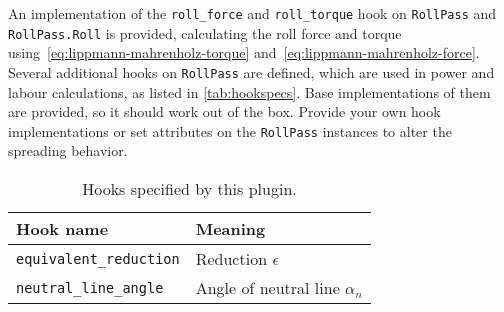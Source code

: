 \documentclass[11pt]{PyRollDocs}
\begin{document}
    An implementation of the \lstinline{roll_force} and \lstinline{roll_torque} hook on \lstinline{RollPass} and \lstinline{RollPass.Roll} is provided,
    calculating the roll force and torque using~\eqref{eq:lippmann-mahrenholz-torque} and~\eqref{eq:lippmann-mahrenholz-force}.
    Several additional hooks on \lstinline{RollPass} are defined, which are used in power and labour calculations, as listed in \autoref{tab:hookspecs}.
    Base implementations of them are provided, so it should work out of the box.
    Provide your own hook implementations or set attributes on the \lstinline{RollPass} instances to alter the spreading behavior.

    \begin{table}
        \centering
        \caption{Hooks specified by this plugin.}
        \label{tab:hookspecs}
        \begin{tabular}{ll}
            \toprule
            Hook name                                             & Meaning                                               \\
            \midrule
            \texttt{equivalent\_reduction}                        & Reduction $\epsilon$                                  \\
            \texttt{neutral\_line\_angle}             & Angle of neutral line $\alpha_n$                      \\
            \bottomrule
        \end{tabular}
    \end{table}

    \printbibliography
\end{document}
